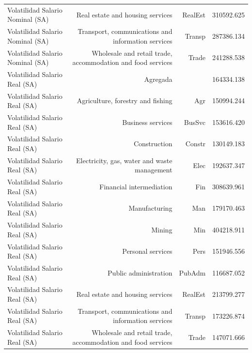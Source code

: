 \begin{longtable}{lrrr}
Volatilidad Salario Nominal (SA) & Real estate and housing services & RealEst & 310592.625 \\ 
Volatilidad Salario Nominal (SA) & Transport, communications and information services & Transp & 287386.134 \\ 
Volatilidad Salario Nominal (SA) & Wholesale and retail trade, accommodation and food services & Trade & 241288.538 \\ 
Volatilidad Salario Real (SA) & Agregada &  & 164334.138 \\ 
Volatilidad Salario Real (SA) & Agriculture, forestry and fishing & Agr & 150994.244 \\ 
Volatilidad Salario Real (SA) & Business services & BusSvc & 153616.420 \\ 
Volatilidad Salario Real (SA) & Construction & Constr & 130149.183 \\ 
Volatilidad Salario Real (SA) & Electricity, gas, water and waste management & Elec & 192637.347 \\ 
Volatilidad Salario Real (SA) & Financial intermediation & Fin & 308639.961 \\ 
Volatilidad Salario Real (SA) & Manufacturing & Man & 179170.463 \\ 
Volatilidad Salario Real (SA) & Mining & Min & 404218.911 \\ 
Volatilidad Salario Real (SA) & Personal services & Pers & 151946.556 \\ 
Volatilidad Salario Real (SA) & Public administration & PubAdm & 116687.052 \\ 
Volatilidad Salario Real (SA) & Real estate and housing services & RealEst & 213799.277 \\ 
Volatilidad Salario Real (SA) & Transport, communications and information services & Transp & 173226.874 \\ 
Volatilidad Salario Real (SA) & Wholesale and retail trade, accommodation and food services & Trade & 147071.666 \\ 
\hline
\end{longtable}
